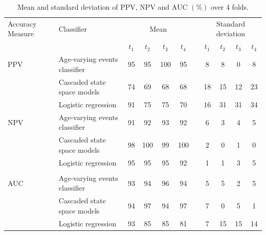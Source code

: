 \documentclass[a4paper,11pt]{article}
\begin{document}
 
\begin{table}[!h]
	\centering
	\begin{tabular}{llccccccccc}
		\toprule
		Accuracy Measure & Classifier  & \multicolumn{4}{c}{Mean} & & \multicolumn{4}{c}{Standard deviation}   \\
		\cmidrule{3-6} \cmidrule{8-11}
		& & $t_1$ &  $t_2$ &  $t_3$ &  $t_4$   & &   $t_1$ &  $t_2$ &  $t_3$ &  $t_4$ \\
		\midrule
		PPV              & Age-varying events classifier & 95    & 95   & 100  & 95   & & 8 & 8 & 0 & 8    \\
		                 & Cascaded state space models  & 74     & 69   & 68   & 68   & & 18 & 15 & 12& 23   \\
		                 & Logistic regression          & 91     & 75   & 75   & 70   & & 16 & 31 & 31 & 34     \\
		\hline
		NPV              & Age-varying events classifier & 91    & 92   & 93   & 92    & & 6 & 3 & 4 & 5   \\
		                 & Cascaded state space models  & 98     & 100  & 99   & 100   & & 2 & 0 & 1 & 0   \\
		                 & Logistic regression          & 95     & 95   & 95   & 92    & & 1 & 1 & 3 & 5 \\   \\
		\hline
		AUC              & Age-varying events classifier & 93    & 94   & 96   & 94   & & 5 & 5 & 2 & 5    \\
		                 & Cascaded state space models  & 94     & 97   & 94   & 97   & & 7 & 0 & 5& 1    \\
		                 & Logistic regression          & 93     & 85   & 85   & 81   & & 7 & 15 & 15 & 14     \\
		\bottomrule
	\end{tabular}
	 \caption{Mean and standard deviation of PPV, NPV and AUC $(\%)$ over $4$ folds.}\label{tab:AverageAccuracyReal}
\end{table}
\end{document}
